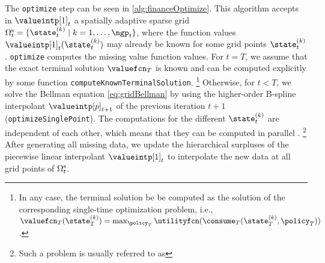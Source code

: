 The \texttt{optimize} step can be seen in \cref{alg:financeOptimize}.
This algorithm accepts in $\valueintp[1]_t$
a spatially adaptive sparse grid
$\gridset{t}{\sparse}
= \{\state_t^{(k)} \mid k = 1, \dotsc, \ngp_t\}$,
where the function values $\valueintp[1]_t(\state_t^{(k)})$
may already be known for some grid points $\state_t^{(k)}$.
\texttt{optimize} computes the missing value function values.
For $t = T$, we assume that the exact terminal solution
$\valuefcn_T$ is known and can be computed explicitly by some function
\texttt{computeKnownTerminalSolution}.%
\footnote{%
  In any case, the terminal solution be be computed as the
  solution of the corresponding single-time optimization problem,
  i.e., $\valuefcn_T(\state_T^{(k)})
  = \max_{\policy_T} \utilityfcn(\consume_T(\state_T^{(k)}, \policy_T))$.%
}
Otherwise, for $t < T$, we solve the Bellman equation
\eqref{eq:gridBellman} by using the higher-order B-spline interpolant
$\valueintp[p]_{t+1}$ of the previous iteration $t + 1$
(\texttt{optimizeSinglePoint}).
The computations for the different $\state_t^{(k)}$ are
independent of each other,
which means that they can be computed in parallel \cite{Horneff16Efficient}.%
\footnote{%
  Such a problem is usually referred to as %
}
After generating all missing data,
we update the hierarchical surpluses of the
piecewise linear interpolant $\valueintp[1]_t$
to interpolate the new data at all grid points of $\gridset{t}{\sparse}$.

